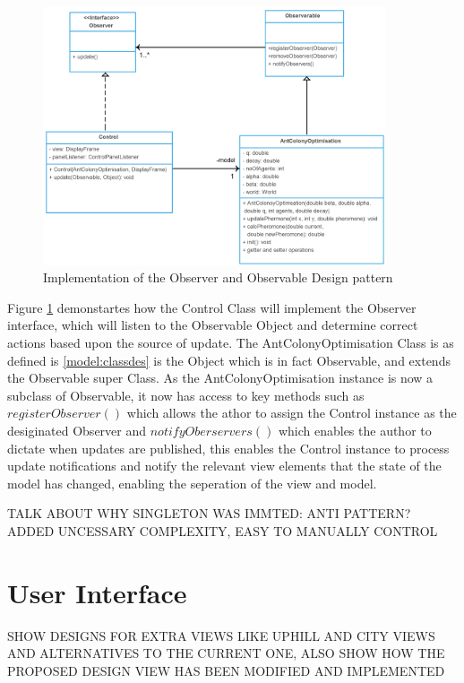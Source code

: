 \begin{figure}[H]
\centering
\includegraphics[width=0.9\textwidth]{Images/chapter4/observerImplemetation}
\caption{Implementation of the Observer and Observable Design pattern}
\label{fig:observableImp}
\end{figure}

Figure \ref{fig:observableImp} demonstartes how the Control Class will implement the Observer interface, which will listen to the Observable Object and determine correct actions based upon the source of update. The AntColonyOptimisation Class is as defined is \ref{model:classdes} is the Object which is in fact Observable, and extends the Observable super Class. As the AntColonyOptimisation instance is now a subclass of Observable, it now has access to key methods such as $registerObserver()$ which allows the athor to assign the Control instance as the desiginated Observer and $notifyOberservers()$ which enables the author to dictate when updates are published, this enables the Control instance to process update notifications and notify the relevant view elements that the state of the model has changed, enabling the seperation of the view and model.

\Large TALK ABOUT WHY SINGLETON WAS IMMTED: ANTI PATTERN? ADDED UNCESSARY COMPLEXITY, EASY TO MANUALLY CONTROL\normalsize

\section{User Interface}

\Large SHOW DESIGNS FOR EXTRA VIEWS LIKE UPHILL AND CITY VIEWS AND ALTERNATIVES TO THE CURRENT ONE, ALSO SHOW HOW THE PROPOSED DESIGN VIEW HAS BEEN MODIFIED AND IMPLEMENTED\normalsize

